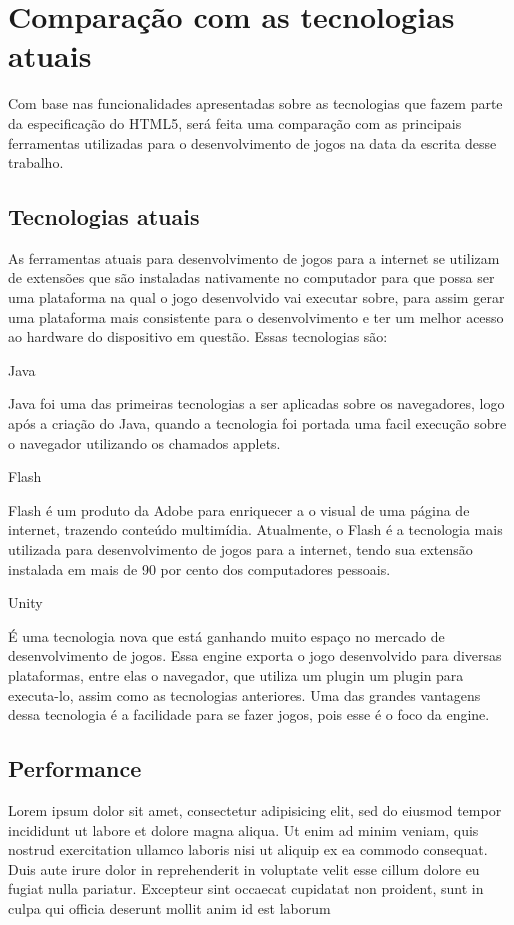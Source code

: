 \section{Comparação com as tecnologias atuais}

Com base nas funcionalidades apresentadas sobre as tecnologias que
fazem parte da especificação do HTML5, será feita uma comparação com
as principais ferramentas utilizadas para o desenvolvimento de jogos
na data da escrita desse trabalho.

\subsection{Tecnologias atuais}

As ferramentas atuais para desenvolvimento de jogos para a internet se
utilizam de extensões que são instaladas nativamente no computador
para que possa ser uma plataforma na qual o jogo desenvolvido vai
executar sobre, para assim gerar uma plataforma mais consistente para
o desenvolvimento e ter um melhor acesso ao hardware do dispositivo em
questão. Essas tecnologias são:

Java

Java foi uma das primeiras tecnologias a ser aplicadas sobre os
navegadores, logo após a criação do Java, quando a tecnologia foi
portada uma facil execução sobre o navegador utilizando os chamados
applets.

Flash

Flash é um produto da Adobe para enriquecer a o visual de uma página
de internet, trazendo conteúdo multimídia. Atualmente, o Flash é a
tecnologia mais utilizada para desenvolvimento de jogos para a
internet, tendo sua extensão instalada em mais de 90 por cento dos
computadores pessoais.

Unity

É uma tecnologia nova que está ganhando muito espaço no mercado de
desenvolvimento de jogos. Essa engine exporta o jogo desenvolvido para
diversas plataformas, entre elas o navegador, que utiliza um plugin um
plugin para executa-lo, assim como as tecnologias anteriores.
Uma das grandes vantagens dessa tecnologia é a facilidade para se
fazer jogos, pois esse é o foco da engine.

\subsection{Performance}

Lorem ipsum dolor sit amet, consectetur adipisicing elit, sed do eiusmod tempor incididunt ut labore et dolore magna aliqua. Ut enim ad minim veniam, quis nostrud exercitation ullamco laboris nisi ut aliquip ex ea commodo consequat. Duis aute irure dolor in reprehenderit in voluptate velit esse cillum dolore eu fugiat nulla pariatur.  Excepteur sint occaecat cupidatat non proident, sunt in culpa qui officia deserunt mollit anim id est laborum

